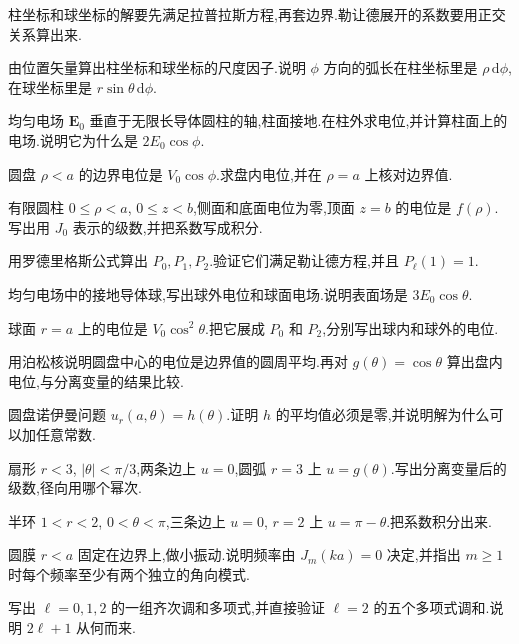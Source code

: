 柱坐标和球坐标的解要先满足拉普拉斯方程,再套边界.勒让德展开的系数要用正交关系算出来.

\begin{problemset}
\renewcommand{\theenumi}{\thechapter.\arabic{enumi}}
\renewcommand{\labelenumi}{\theenumi.}
\item 由位置矢量算出柱坐标和球坐标的尺度因子.说明 $\phi$ 方向的弧长在柱坐标里是 $\rho\,\mathrm{d}\phi$,在球坐标里是 $r\sin\theta\,\mathrm{d}\phi$.

\item 均匀电场 $\mathbf{E}_0$ 垂直于无限长导体圆柱的轴,柱面接地.在柱外求电位,并计算柱面上的电场.说明它为什么是 $2E_0\cos\phi$.

\item 圆盘 $\rho<a$ 的边界电位是 $V_0\cos\phi$.求盘内电位,并在 $\rho=a$ 上核对边界值.

\item 有限圆柱 $0\leq\rho<a$, $0\leq z<b$,侧面和底面电位为零,顶面 $z=b$ 的电位是 $f(\rho)$.写出用 $J_0$ 表示的级数,并把系数写成积分.

\item 用罗德里格斯公式算出 $P_0,P_1,P_2$.验证它们满足勒让德方程,并且 $P_\ell(1)=1$.

\item 均匀电场中的接地导体球,写出球外电位和球面电场.说明表面场是 $3E_0\cos\theta$.

\item 球面 $r=a$ 上的电位是 $V_0\cos^2\theta$.把它展成 $P_0$ 和 $P_2$,分别写出球内和球外的电位.

\item 用泊松核说明圆盘中心的电位是边界值的圆周平均.再对 $g(\theta)=\cos\theta$ 算出盘内电位,与分离变量的结果比较.

\item 圆盘诺伊曼问题 $u_r(a,\theta)=h(\theta)$.证明 $h$ 的平均值必须是零,并说明解为什么可以加任意常数.

\item 扇形 $r<3$, $|\theta|<\pi/3$,两条边上 $u=0$,圆弧 $r=3$ 上 $u=g(\theta)$.写出分离变量后的级数,径向用哪个幂次.

\item 半环 $1<r<2$, $0<\theta<\pi$,三条边上 $u=0$, $r=2$ 上 $u=\pi-\theta$.把系数积分出来.

\item 圆膜 $r<a$ 固定在边界上,做小振动.说明频率由 $J_m(ka)=0$ 决定,并指出 $m\geq 1$ 时每个频率至少有两个独立的角向模式.

\item 写出 $\ell=0,1,2$ 的一组齐次调和多项式,并直接验证 $\ell=2$ 的五个多项式调和.说明 $2\ell+1$ 从何而来.
\end{problemset}

